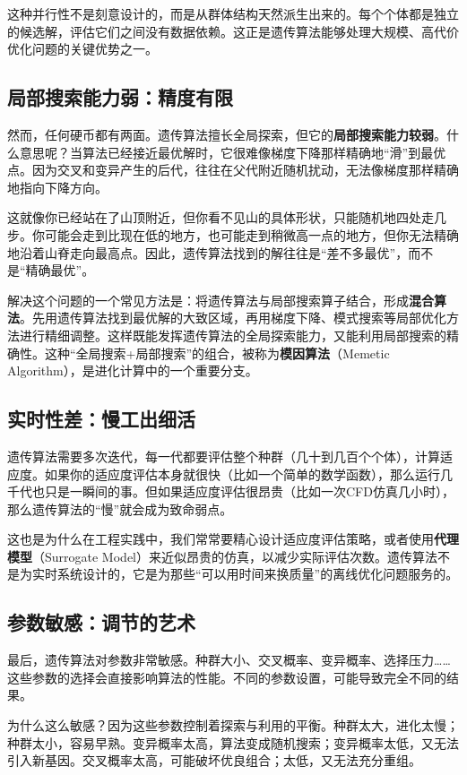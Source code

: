 \documentclass[lang=cn,zihao=-4,a4paper,fontset=windows]{beautybook}
\begin{document}
这种并行性不是刻意设计的，而是从群体结构天然派生出来的。每个个体都是独立的候选解，评估它们之间没有数据依赖。这正是遗传算法能够处理大规模、高代价优化问题的关键优势之一。

\subsection{局部搜索能力弱：精度有限}

然而，任何硬币都有两面。遗传算法擅长全局探索，但它的\textbf{局部搜索能力较弱}。什么意思呢？当算法已经接近最优解时，它很难像梯度下降那样精确地“滑”到最优点。因为交叉和变异产生的后代，往往在父代附近随机扰动，无法像梯度那样精确地指向下降方向。

这就像你已经站在了山顶附近，但你看不见山的具体形状，只能随机地四处走几步。你可能会走到比现在低的地方，也可能走到稍微高一点的地方，但你无法精确地沿着山脊走向最高点。因此，遗传算法找到的解往往是“差不多最优”，而不是“精确最优”。

解决这个问题的一个常见方法是：将遗传算法与局部搜索算子结合，形成\textbf{混合算法}。先用遗传算法找到最优解的大致区域，再用梯度下降、模式搜索等局部优化方法进行精细调整。这样既能发挥遗传算法的全局探索能力，又能利用局部搜索的精确性。这种“全局搜索+局部搜索”的组合，被称为\textbf{模因算法}（Memetic Algorithm），是进化计算中的一个重要分支。

\subsection{实时性差：慢工出细活}

遗传算法需要多次迭代，每一代都要评估整个种群（几十到几百个个体），计算适应度。如果你的适应度评估本身就很快（比如一个简单的数学函数），那么运行几千代也只是一瞬间的事。但如果适应度评估很昂贵（比如一次CFD仿真几小时），那么遗传算法的“慢”就会成为致命弱点。

这也是为什么在工程实践中，我们常常要精心设计适应度评估策略，或者使用\textbf{代理模型}（Surrogate Model）来近似昂贵的仿真，以减少实际评估次数。遗传算法不是为实时系统设计的，它是为那些“可以用时间来换质量”的离线优化问题服务的。

\subsection{参数敏感：调节的艺术}

最后，遗传算法对参数非常敏感。种群大小、交叉概率、变异概率、选择压力……这些参数的选择会直接影响算法的性能。不同的参数设置，可能导致完全不同的结果。

为什么这么敏感？因为这些参数控制着探索与利用的平衡。种群太大，进化太慢；种群太小，容易早熟。变异概率太高，算法变成随机搜索；变异概率太低，又无法引入新基因。交叉概率太高，可能破坏优良组合；太低，又无法充分重组。
\end{document}
